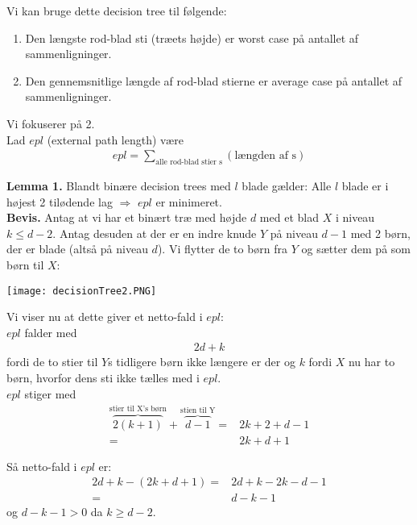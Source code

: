 Vi kan bruge dette decision tree til følgende: 
\begin{enumerate}
	\item Den længste rod-blad sti (træets højde) er worst case på antallet af sammenligninger.
	\item Den gennemsnitlige længde af rod-blad stierne er average case på antallet af sammenligninger. 
\end{enumerate}
Vi fokuserer på 2. \\

Lad $epl$ (external path length) være
\begin{align*}
	epl=\sum_{\text{alle rod-blad stier s}} (\text{længden af s})
\end{align*}

\textbf{Lemma 1.} Blandt binære decision trees med $l$ blade gælder: Alle $l$ blade er i højest 2 tilødende lag $\Rightarrow$ $epl$ er minimeret. \\

\textbf{Bevis.} Antag at vi har et binært træ med højde $d$ med et blad $X$ i niveau $k\le d-2$. Antag desuden at der er en indre knude $Y$ på niveau $d-1$ med 2 børn, der er blade (altså på niveau $d$). Vi flytter de to børn fra $Y$ og sætter dem på som børn til $X$: 

\begin{center}
	\texttt{[image: decisionTree2.PNG]}
\end{center}

Vi viser nu at dette giver et netto-fald i $epl$: \\

$epl$ falder med 
\begin{align*}
	2d+k
\end{align*}
fordi de to stier til $Y$s tidligere børn ikke længere er der og $k$ fordi $X$ nu har to børn, hvorfor dens sti ikke tælles med i $epl$. \\

$epl$ stiger med
\begin{align*}
	\overbrace{2(k+1)}^{\text{stier til X's børn}}+\overbrace{d-1}^{\text{stien til Y}} =& 2k+2+d-1 \\
	=& 2k+d+1 
\end{align*}

Så netto-fald i $epl$ er: 
\begin{align*}
	2d+k-( 2k+d+1) =& 2d+k-2k-d-1 \\
	=& d-k-1
\end{align*}
og $d-k-1>0$ da $k\ge d-2$. \\

